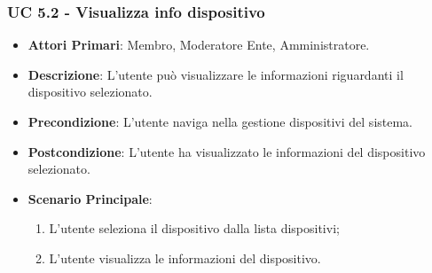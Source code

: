 			\subsubsection{UC 5.2 - Visualizza info dispositivo}
			\begin{itemize}
				\item \textbf{Attori Primari}: Membro, Moderatore Ente, Amministratore.
				\item \textbf{Descrizione}: L'utente può visualizzare le informazioni riguardanti il dispositivo selezionato.
				\item \textbf{Precondizione}: L'utente naviga nella gestione dispositivi del sistema.
				\item \textbf{Postcondizione}: L'utente ha visualizzato le informazioni del dispositivo selezionato.
				\item \textbf{Scenario Principale}:
				\begin{enumerate}
					\item{L'utente seleziona il dispositivo dalla lista dispositivi;}
					\item{L'utente visualizza le informazioni del dispositivo.}
				\end{enumerate}
			\end{itemize}
			
